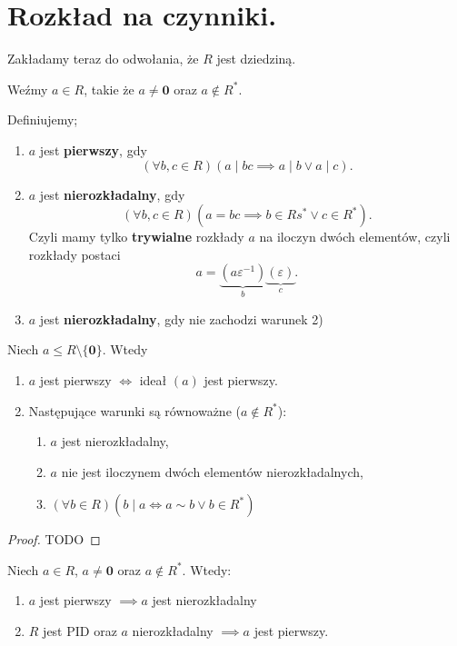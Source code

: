 \section{Rozkład na czynniki.}
\begin{context}

	Zakładamy teraz do odwołania, że $R$ jest dziedziną.
\end{context}
Weźmy $a\in R$, takie że $a\neq \mathbf{0}$ oraz $a\not\in R^{\ast} $.
\begin{definition}
	Definiujemy;

	\begin{enumerate}[label=\arabic*)]
		\item $a$ jest \textbf{pierwszy}, gdy 
			\[
			\left(\forall b,c \in R \right) \left( a\mid bc \implies a\mid b \lor a\mid c \right) 
			.\] 
		\item $a$ jest \textbf{nierozkładalny}, gdy 
			\[
			\left(\forall b,c \in R \right)\left( a = bc \implies b \in Rs^{\ast} \lor c \in R^{\ast}  \right)  
			.\] 
			Czyli mamy tylko \textbf{trywialne} rozkłady $a$ na iloczyn dwóch elementów, czyli rozkłady postaci
			\[
			a = \underbrace{\left( a\varepsilon ^{-1} \right) }_{b} \underbrace{\left( \varepsilon  \right) }_{c} 
			.\] 
		\item $a$ jest \textbf{nierozkładalny}, gdy nie zachodzi warunek 2)
	\end{enumerate}
\end{definition} 
\begin{remark}
	Niech $a \le R\setminus \{\mathbf{0}\} $. Wtedy
	\begin{enumerate}[label=\arabic*)]
		\item $a$ jest pierwszy $\iff $ ideał $\left( a \right) $ jest pierwszy.
		\item Następujące warunki są równoważne ($a \not\in R^{\ast} $):
			\begin{enumerate}[label=\roman*)]
				\item $a$ jest nierozkładalny,
				\item $a$ nie jest iloczynem dwóch elementów nierozkładalnych,
				\item $\left(\forall b\in R \right)\left( b\mid a \iff a\sim b \lor b \in R^{\ast}  \right)  $
			\end{enumerate}
	\end{enumerate}
\end{remark} 
\begin{proof}
	TODO
\end{proof} 
\begin{theorem}
	Niech $a\in R$, $a\neq \mathbf{0}$ oraz $a \not\in R^{\ast} $. Wtedy:
	\begin{enumerate}[label=\arabic*)]
		\item $a$ jest pierwszy $\implies a$ jest nierozkładalny
		\item $R$ jest PID oraz $a$ nierozkładalny $\implies a$ jest pierwszy.
	\end{enumerate}
\end{theorem} 
